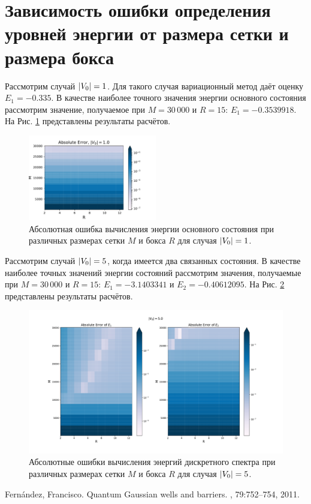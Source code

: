 \documentclass[10pt]{article}
\begin{document}
\section{Зависимость ошибки определения уровней энергии от размера сетки и размера бокса}

Рассмотрим случай $\abs{V_0}=1$. Для такого случая вариационный метод даёт оценку $E_1 = -0.335$. В качестве наиболее точного значения энергии основного состояния рассмотрим значение, получаемое при $M=30\,000$ и $R=15$: $E_1 = -0.3539918$. На Рис. \ref{fig:abserr} представлены результаты расчётов.
\begin{figure}[htbp]
    \centering
    \includegraphics[width=0.5\textwidth]{../figures/abserr}
    \caption{Абсолютная ошибка вычисления энергии основного состояния при различных размерах сетки $M$ и бокса $R$ для случая $\abs{V_0}=1$.}
    \label{fig:abserr}
\end{figure}

Рассмотрим случай $\abs{V_0}=5$, когда имеется два связанных состояния. В качестве наиболее точных значений энергии состояний рассмотрим значения, получаемые при $M=30\,000$ и $R=15$: $E_1 = -3.1403341$ и $E_2 = -0.40612095$. На Рис. \ref{fig:abserr_v0_5} представлены результаты расчётов.
\begin{figure}[htbp]
    \centering
    \includegraphics[width=\textwidth]{../figures/abserr_v0_5}
    \caption{Абсолютные ошибки вычисления энергий дискретного спектра при различных размерах сетки $M$ и бокса $R$ для случая $\abs{V_0}=5$.}
    \label{fig:abserr_v0_5}
\end{figure}

\begin{thebibliography}{10}
    Fernández, Francisco.
    \newblock Quantum Gaussian wells and barriers.
    , 79:752--754, 2011.
\end{thebibliography}
\end{document}
